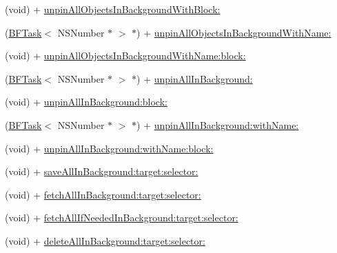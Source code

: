 \begin{DoxyCompactItemize}
\begin{DoxyCompactList}
 \end{DoxyCompactList}\item 
(void) + \hyperlink{interface_p_f_object_af4d0ce20b4d2a0cf08912a0046619a29}{unpin\+All\+Objects\+In\+Background\+With\+Block\+:}
\item 
(\hyperlink{class_b_f_task}{B\+F\+Task}$<$ N\+S\+Number $\ast$ $>$ $\ast$) + \hyperlink{interface_p_f_object_a49ad7889dc8206ba61051760b8a42586}{unpin\+All\+Objects\+In\+Background\+With\+Name\+:}
\item 
(void) + \hyperlink{interface_p_f_object_a74f7c4519557f4f5f7b1fa1ddf7a9f95}{unpin\+All\+Objects\+In\+Background\+With\+Name\+:block\+:}
\item 
(\hyperlink{class_b_f_task}{B\+F\+Task}$<$ N\+S\+Number $\ast$ $>$ $\ast$) + \hyperlink{interface_p_f_object_ae2c1c6ba8eed25384308b9a7f38c68e3}{unpin\+All\+In\+Background\+:}
\item 
(void) + \hyperlink{interface_p_f_object_afded4838c3eb3a604539ae4e9abf6aad}{unpin\+All\+In\+Background\+:block\+:}
\item 
(\hyperlink{class_b_f_task}{B\+F\+Task}$<$ N\+S\+Number $\ast$ $>$ $\ast$) + \hyperlink{interface_p_f_object_a00bd8fd34ed5e829a105d9f55acd43e8}{unpin\+All\+In\+Background\+:with\+Name\+:}
\item 
(void) + \hyperlink{interface_p_f_object_a0fbca2dc625f1bf4044f1e4ebd8fa622}{unpin\+All\+In\+Background\+:with\+Name\+:block\+:}
\item 
(void) + \hyperlink{interface_p_f_object_aa1fba48cec5bba80c72e6af4d8d88717}{save\+All\+In\+Background\+:target\+:selector\+:}
\begin{DoxyCompactList}\small\item\em 

 \end{DoxyCompactList}\item 
(void) + \hyperlink{interface_p_f_object_ad503445a923bc28ce86b3540e99ad290}{fetch\+All\+In\+Background\+:target\+:selector\+:}
\begin{DoxyCompactList}\small\item\em 

 \end{DoxyCompactList}\item 
(void) + \hyperlink{interface_p_f_object_aa783e119f260f5e8598abb0564359318}{fetch\+All\+If\+Needed\+In\+Background\+:target\+:selector\+:}
\item 
(void) + \hyperlink{interface_p_f_object_a312996cea1a17a6f4bbdfde07f4891a1}{delete\+All\+In\+Background\+:target\+:selector\+:}
\begin{DoxyCompactList}\small\item\em 


\end{DoxyCompactList}
\end{DoxyCompactItemize}
